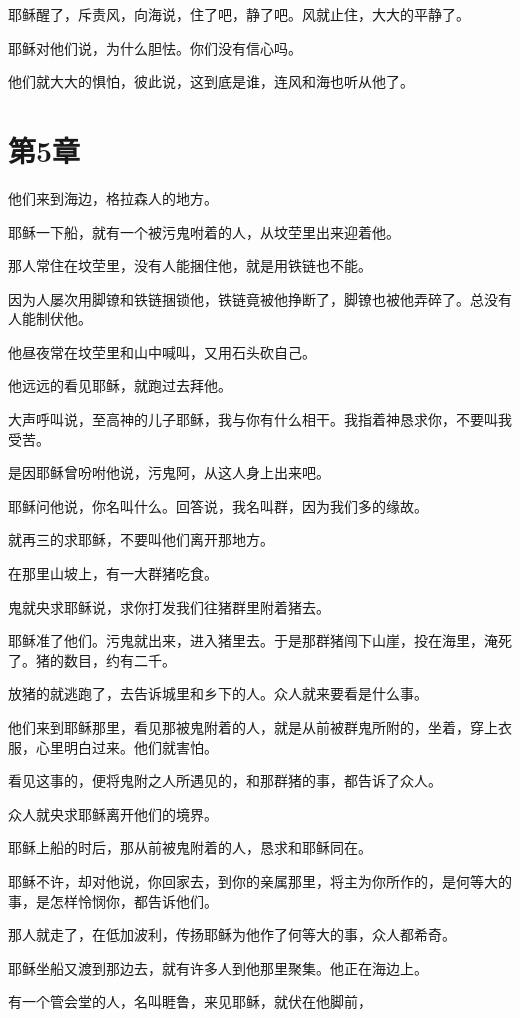 \documentclass[12pt,oneside]{book}
\begin{document}
耶稣醒了，斥责风，向海说，住了吧，静了吧。风就止住，大大的平静了。

耶稣对他们说，为什么胆怯。你们没有信心吗。

他们就大大的惧怕，彼此说，这到底是谁，连风和海也听从他了。

\chapter{第5章}
他们来到海边，格拉森人的地方。

耶稣一下船，就有一个被污鬼咐着的人，从坟茔里出来迎着他。

那人常住在坟茔里，没有人能捆住他，就是用铁链也不能。

因为人屡次用脚镣和铁链捆锁他，铁链竟被他挣断了，脚镣也被他弄碎了。总没有人能制伏他。

他昼夜常在坟茔里和山中喊叫，又用石头砍自己。

他远远的看见耶稣，就跑过去拜他。

大声呼叫说，至高神的儿子耶稣，我与你有什么相干。我指着神恳求你，不要叫我受苦。

是因耶稣曾吩咐他说，污鬼阿，从这人身上出来吧。

耶稣问他说，你名叫什么。回答说，我名叫群，因为我们多的缘故。

就再三的求耶稣，不要叫他们离开那地方。

在那里山坡上，有一大群猪吃食。

鬼就央求耶稣说，求你打发我们往猪群里附着猪去。

耶稣准了他们。污鬼就出来，进入猪里去。于是那群猪闯下山崖，投在海里，淹死了。猪的数目，约有二千。

放猪的就逃跑了，去告诉城里和乡下的人。众人就来要看是什么事。

他们来到耶稣那里，看见那被鬼附着的人，就是从前被群鬼所附的，坐着，穿上衣服，心里明白过来。他们就害怕。

看见这事的，便将鬼附之人所遇见的，和那群猪的事，都告诉了众人。

众人就央求耶稣离开他们的境界。

耶稣上船的时后，那从前被鬼附着的人，恳求和耶稣同在。

耶稣不许，却对他说，你回家去，到你的亲属那里，将主为你所作的，是何等大的事，是怎样怜悯你，都告诉他们。

那人就走了，在低加波利，传扬耶稣为他作了何等大的事，众人都希奇。

耶稣坐船又渡到那边去，就有许多人到他那里聚集。他正在海边上。

有一个管会堂的人，名叫睚鲁，来见耶稣，就伏在他脚前，
\end{document}
